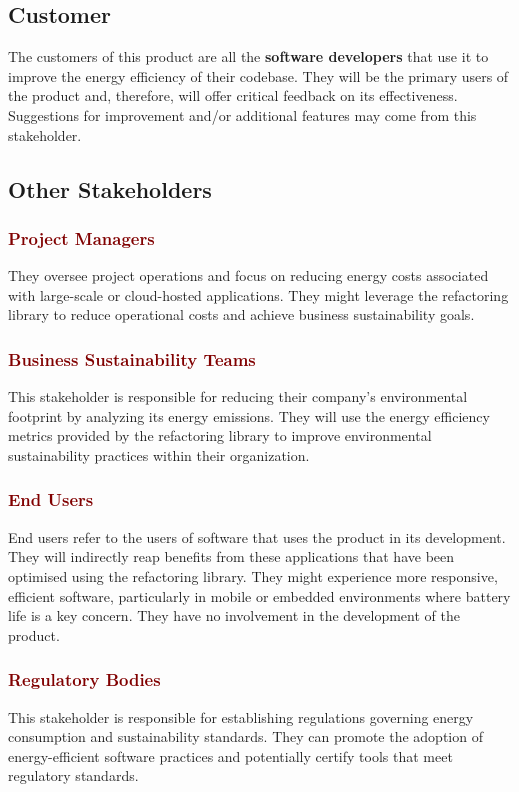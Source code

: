\documentclass[12pt]{article}
\begin{document}
\subsection{Customer}
The customers of this product are all the \textbf{software developers} that use it to improve the energy efficiency of their codebase. They will be the primary users of the product and, therefore, will offer critical feedback on its effectiveness. Suggestions for improvement and/or additional features may come from this stakeholder. 

\subsection{Other Stakeholders}
\subsubsection*{\textcolor{Maroon}{Project Managers}}
They oversee project operations and focus on reducing energy costs associated with large-scale or cloud-hosted applications. They might leverage the refactoring library to reduce operational costs and achieve business sustainability goals.

\subsubsection*{\textcolor{Maroon}{Business Sustainability Teams}}
This stakeholder is responsible for reducing their company's environmental footprint by analyzing its energy emissions. They will use the energy efficiency metrics provided by the refactoring library to improve environmental sustainability practices within their organization.

\subsubsection*{\textcolor{Maroon}{End Users}}
End users refer to the users of software that uses the product in its development. They will indirectly reap benefits from these applications that have been optimised using the refactoring library. They might experience more responsive, efficient software, particularly in mobile or embedded environments where battery life is a key concern. They have no involvement in the development of the product. 

\subsubsection*{\textcolor{Maroon}{Regulatory Bodies}}
This stakeholder is responsible for establishing regulations governing energy consumption and sustainability standards. They can promote the adoption of energy-efficient software practices and potentially certify tools that meet regulatory standards. 
\end{document}
